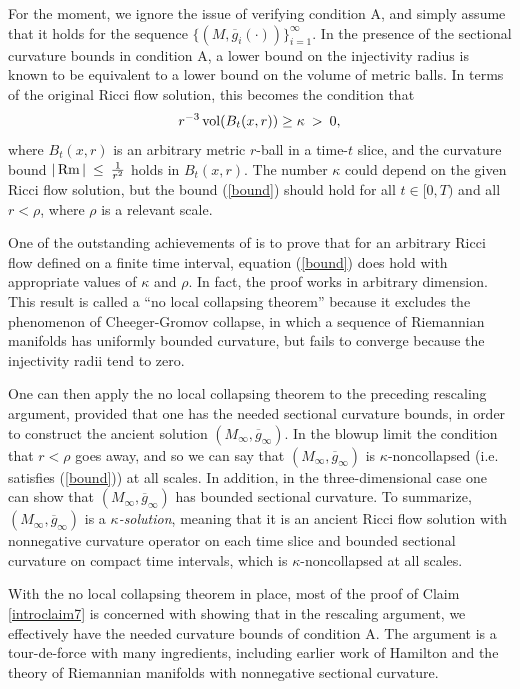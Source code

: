 For the moment, we ignore the issue of verifying condition A,
and simply assume that it holds for the sequence
$\{(M, \overline{g}_i(\cdot))\}_{i=1}^\infty$.
 In the presence
of the sectional curvature bounds in condition A,  a lower
bound on the injectivity
radius is known to be equivalent to a lower bound on the volume of
metric balls.  In terms of the original Ricci flow solution, this
becomes the condition that
\begin{equation} \label{bound}
r^{-3} \operatorname{vol}(B_t(x, r)) \ge \kappa \: > \: 0,
\end{equation}
where  $B_t(x, r)$ is
an arbitrary
metric $r$-ball in a time-$t$ slice, and the   curvature
bound   $|\operatorname{Rm}| \: \le \: \frac{1}{r^2}$ holds in $B_t(x,r)$.
The number $\kappa$ could depend on the
given Ricci flow solution, but the bound (\ref{bound})
should hold for all $t \in [0, T)$ and all $r < \rho$, where $\rho$ is a relevant
scale.


One of the outstanding achievements of \cite{Perelman} is to prove that
for an arbitrary Ricci flow defined on a
finite time interval, equation
(\ref{bound}) does hold with appropriate values of $\kappa$ and $\rho$.
In fact, the proof works in arbitrary dimension.
This result is called
a ``no local collapsing
theorem'' because it excludes the phenomenon of Cheeger-Gromov
collapse, in which a sequence of Riemannian manifolds has uniformly
bounded curvature, but fails to converge because the injectivity
radii tend to zero.

One can then
apply the no local collapsing theorem to the preceding rescaling argument,
provided that one has the needed sectional curvature bounds, in order to construct the
ancient solution $(M_\infty,\overline g_\infty)$.
In the blowup limit the condition that $r < \rho$ goes away, and so we
can say that $(M_\infty,\overline g_\infty)$ is $\kappa$-noncollapsed
(i.e. satisfies (\ref{bound})) at all scales. In addition, in the three-dimensional
case one can show that $(M_\infty,\overline g_\infty)$ has bounded sectional
curvature. To summarize, $(M_\infty,\overline g_\infty)$ is a
{\em $\kappa$-solution},
meaning that it is an ancient Ricci flow solution with nonnegative curvature operator on
each time slice and bounded sectional curvature
on compact time intervals,
which is $\kappa$-noncollapsed
at all scales.

With  the no local collapsing theorem in place, most of the proof of
Claim \ref{introclaim7} is concerned with showing that in the rescaling
argument, we effectively have the needed curvature
bounds of condition A.  The argument is a tour-de-force with many ingredients,
including earlier work
of Hamilton and the theory of
Riemannian manifolds with nonnegative sectional curvature.


